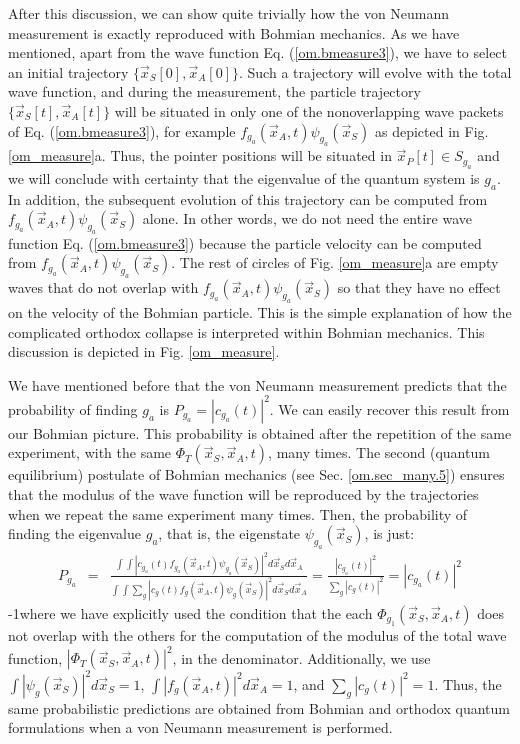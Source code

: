 \documentclass[onecolumn,nofootinbib, secnumarabic, amsmath, nobibnotes,11pt,aps,pra]{revtex4-1}
\newcommand{\fref}[1]{Fig. \ref{#1}}
\newcommand{\sref}[1]{Sec. \ref{#1}}
\newcommand{\eref}[1]{Eq. (\ref{#1})}
\begin{document}
After this discussion, we can show quite trivially how the von
Neumann measurement is exactly reproduced with Bohmian mechanics. As
we have mentioned, apart from the wave function \eref{om.bmeasure3}, we
have to select an initial trajectory $\{\vec x_S[0],\vec x_A[0]\}$.
Such a trajectory will evolve with the total wave function, and
during the measurement, the particle trajectory $\{\vec x_S[t],\vec
x_A[t]\}$ will be situated in only one of the nonoverlapping wave
packets of \eref{om.bmeasure3}, for example $f_{g_a}(\vec x_A,t)
\psi_{g_a}(\vec x_S)$ as depicted in \fref{om_measure}a. Thus, the
pointer positions will be situated in $\vec x_P[t]\in S_{g_a}$ and
we will conclude with certainty that the eigenvalue of the quantum
system is $g_a$. In addition, the subsequent evolution of this
trajectory can be computed from $f_{g_a}(\vec x_A,t) \psi_{g_a}(\vec
x_S)$ alone. In other words, we do not need the entire wave function
\eref{om.bmeasure3} because the particle velocity can be computed
from $f_{g_a}(\vec x_A,t) \psi_{g_a}(\vec x_S)$. The rest of circles
of \fref{om_measure}a are empty waves that do not overlap with
$f_{g_a}(\vec x_A,t) \psi_{g_a}(\vec x_S)$ so that they have no
effect on the velocity of the Bohmian particle. This is the simple
explanation of how the complicated orthodox collapse is interpreted
within Bohmian mechanics. This discussion is depicted in
\fref{om_measure}.

We have mentioned before that the von Neumann measurement predicts that the probability of finding $g_a$ is $P_{g_a} = |c_{g_a}(t)|^2$. We can easily recover this result from our Bohmian picture. This probability is obtained after the repetition of the same experiment, with the same $\Phi_T(\vec x_S,\vec x_A,t)$, many times. The second (quantum equilibrium) postulate of Bohmian mechanics (see \sref{om.sec_many.5}) ensures that the modulus of the wave function will be reproduced by the trajectories when we repeat the same experiment many times. Then, the probability of finding the eigenvalue $g_a$, that is, the eigenstate $\psi_{g_a}(\vec x_S)$, is just:
\begin{eqnarray}
P_{g_a} &=& \frac {\int \int |c_{g_a}(t) f_{g_a}(\vec x_A,t) \psi_{g_a}(\vec x_S)|^2 d\vec x_S d\vec x_A} {\int \int \sum_{g} |c_g(t) f_g(\vec x_A,t) \psi_g(\vec x_S)|^2 d\vec x_S d\vec x_A}= \frac {|c_{g_a}(t)|^2} {\sum_{g} |c_g(t)|^2} = |c_{g_a}(t)|^2
\end{eqnarray}
\looseness-1where we have explicitly used the condition that the each
\textit{$\Phi_{g_1}(\vec x_S,\vec x_A,t)$} does not overlap with the others for the
computation of the modulus of the total wave function,
\textit{$|\Phi_T(\vec x_S,\vec x_A,t)|^2$}, in the denominator.
Additionally, we use $\int |\psi_g(\vec x_S)|^2 d\vec x_S = 1$,
$\int |f_g(\vec x_A,t)|^2 d\vec x_A = 1$, and $\sum_{g} |c_g(t)|^2 =
1$. Thus, the same probabilistic predictions are obtained from
Bohmian and orthodox quantum formulations when a von Neumann
measurement is performed.
\end{document}
